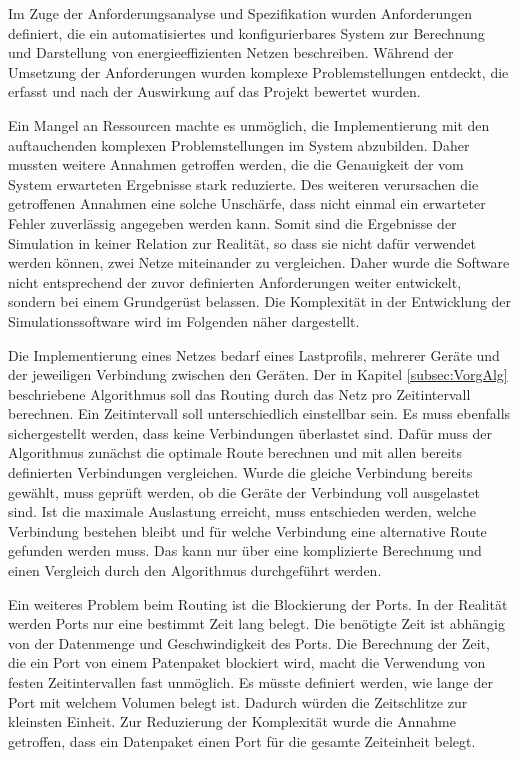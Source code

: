Im Zuge der Anforderungsanalyse und Spezifikation wurden Anforderungen definiert, die ein automatisiertes und konfigurierbares System zur Berechnung und Darstellung von energieeffizienten Netzen beschreiben. Während der Umsetzung der Anforderungen wurden komplexe Problemstellungen entdeckt, die erfasst und nach der Auswirkung auf das Projekt bewertet wurden. 

Ein Mangel an Ressourcen machte es unmöglich, die Implementierung mit den auftauchenden komplexen Problemstellungen im System abzubilden. Daher mussten weitere Annahmen getroffen werden, die die Genauigkeit der vom System erwarteten Ergebnisse stark reduzierte. Des weiteren verursachen die getroffenen Annahmen eine solche Unschärfe, dass nicht einmal ein erwarteter Fehler zuverlässig angegeben werden kann. Somit sind die Ergebnisse der Simulation in keiner Relation zur Realität, so dass sie nicht dafür verwendet werden können, zwei Netze miteinander zu vergleichen. Daher wurde die Software nicht entsprechend der zuvor definierten Anforderungen weiter entwickelt, sondern bei einem Grundgerüst belassen. Die Komplexität in der  Entwicklung der Simulationssoftware wird im Folgenden näher dargestellt.  

Die Implementierung eines Netzes bedarf eines Lastprofils, mehrerer Geräte und der jeweiligen Verbindung zwischen den Geräten. Der in Kapitel \ref{subsec:VorgAlg} beschriebene Algorithmus soll das Routing durch das Netz pro Zeitintervall berechnen. Ein Zeitintervall soll unterschiedlich einstellbar sein. Es muss ebenfalls sichergestellt werden, dass keine Verbindungen überlastet sind. Dafür muss der Algorithmus zunächst die optimale Route berechnen und mit allen bereits definierten Verbindungen vergleichen. Wurde die gleiche Verbindung bereits gewählt, muss geprüft werden, ob die Geräte der Verbindung voll ausgelastet sind. Ist die maximale Auslastung erreicht, muss entschieden werden, welche Verbindung bestehen bleibt und für welche Verbindung eine alternative Route gefunden werden muss. Das kann nur über eine komplizierte Berechnung und einen Vergleich durch den Algorithmus durchgeführt werden. 

Ein weiteres Problem beim Routing ist die Blockierung der Ports. In der Realität werden Ports nur eine bestimmt Zeit lang belegt. Die benötigte Zeit ist abhängig von der Datenmenge und Geschwindigkeit des Ports. Die Berechnung der Zeit, die ein Port von einem Patenpaket blockiert wird, macht  die Verwendung von festen Zeitintervallen fast unmöglich. Es müsste  definiert werden, wie lange der Port mit welchem Volumen belegt ist. Dadurch würden die Zeitschlitze zur kleinsten Einheit. Zur Reduzierung der Komplexität wurde die Annahme getroffen, dass ein Datenpaket einen Port für die gesamte Zeiteinheit belegt. 

